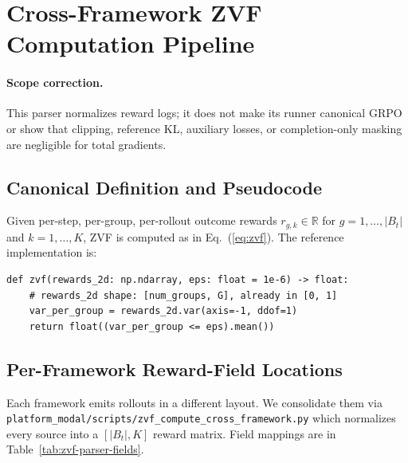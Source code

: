 \providecommand{\artifactstatusword}{released}
\section{Cross-Framework ZVF Computation Pipeline}
\label{sec:appendix:zvf-pipeline}

\paragraph{Scope correction.} This parser normalizes reward logs; it does not
make its runner canonical GRPO or show that clipping, reference KL, auxiliary
losses, or completion-only masking are negligible for total gradients.

\subsection{Canonical Definition and Pseudocode}

Given per-step, per-group, per-rollout outcome rewards
$r_{g,k} \in \mathbb{R}$ for $g=1,\ldots,|B_t|$ and $k=1,\ldots,K$, ZVF
is computed as in Eq.~(\ref{eq:zvf}). The reference implementation is:
\begin{verbatim}
def zvf(rewards_2d: np.ndarray, eps: float = 1e-6) -> float:
    # rewards_2d shape: [num_groups, G], already in [0, 1]
    var_per_group = rewards_2d.var(axis=-1, ddof=1)
    return float((var_per_group <= eps).mean())
\end{verbatim}

\subsection{Per-Framework Reward-Field Locations}

Each framework emits rollouts in a different layout. We consolidate them
via \texttt{platform\_modal/scripts/zvf\_compute\_cross\_framework.py} which normalizes
every source into a $[|B_t|, K]$ reward matrix. Field mappings are in
Table~\ref{tab:zvf-parser-fields}.

